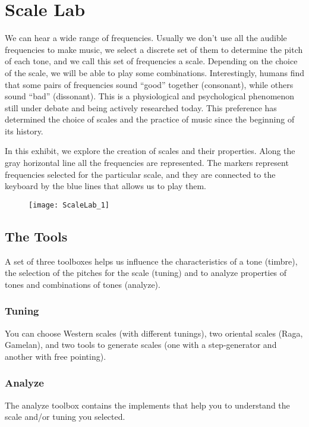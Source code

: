 \section{Scale Lab}
We can hear a wide range of frequencies. Usually we don't use all the audible frequencies to make music, we select a discrete set of them to determine the pitch of each tone, and we call this set of frequencies a scale. Depending on the choice of the scale, we will be able to play some combinations. Interestingly, humans find that some pairs of frequencies sound ``good'' together (consonant), while others sound ``bad'' (dissonant). This is a physiological and psychological phenomenon still under debate and being actively researched today. This preference has determined the choice of scales and the practice of music since the beginning of its history.

In this exhibit, we explore the creation of scales and their properties. Along the gray horizontal line all the frequencies are represented. The markers represent frequencies selected for the particular  scale, and they are connected to the keyboard by the blue lines that allows us to play them.

\begin{figure}[h]
\centering
\texttt{[image: ScaleLab\_1]}
\end{figure}

\subsection{The Tools}
A set of three toolboxes helps us influence the characteristics of a tone (timbre), the selection of the pitches for the scale (tuning) and to analyze properties of tones and combinations of tones (analyze).

\subsubsection{Tuning}
You can choose Western scales (with different tunings), two oriental scales (Raga, Gamelan), and two tools to generate scales (one with a step-generator and another with free pointing).

\subsubsection{Analyze}
The analyze toolbox contains the implements that help you to understand the scale and/or tuning you selected.

